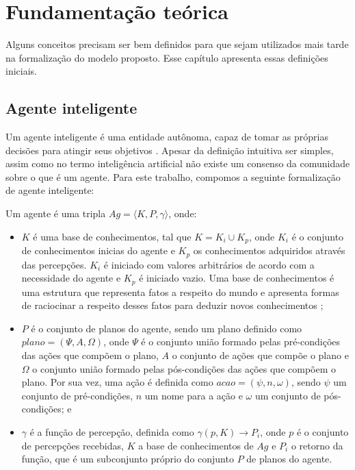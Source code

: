\section{Fundamentação teórica}

Alguns conceitos precisam ser bem definidos para que sejam utilizados mais tarde na formalização do modelo proposto. Esse capítulo apresenta essas definições iniciais.

\subsection{Agente inteligente}

Um agente inteligente é uma entidade autônoma, capaz de tomar as próprias decisões para atingir seus objetivos \cite{wooldridge1999intelligent}. Apesar da definição intuitiva ser simples, assim como no termo inteligência artificial não existe um consenso da comunidade sobre o que é um agente. Para este trabalho, compomos a seguinte formalização de agente inteligente:

\vspace{0.2cm}

\theoremstyle{definition}
\begin{definition}
    \label{def:agent}
    Um agente é uma tripla $Ag = \langle K, P, \gamma \rangle$, onde:
    \begin{itemize}
        \item $K$ é uma base de conhecimentos, tal que $K = K_i \cup K_p$, onde $K_i$ é o conjunto de conhecimentos inicias do agente e $K_p$ os conhecimentos adquiridos através das percepções. $K_i$ é iniciado com valores arbitrários de acordo com a necessidade do agente e $K_p$ é iniciado vazio. Uma base de conhecimentos é uma estrutura que representa fatos a respeito do mundo e apresenta formas de raciocinar a respeito desses fatos para deduzir novos conhecimentos \cite{hayes1983building};
        \item $P$ é o conjunto de planos do agente, sendo um plano definido como $plano = (\Psi, A, \Omega)$, onde $\Psi$ é o conjunto união formado pelas pré-condições das ações que compõem o plano, $A$ o conjunto de ações que compõe o plano e $\Omega$ o conjunto união formado pelas pós-condições das ações que compõem o plano. Por sua vez, uma ação é definida como $acao = (\psi, n, \omega)$, sendo $\psi$ um conjunto de pré-condições, $n$ um nome para a ação e $\omega$ um conjunto de pós-condições; e
        \item $\gamma$ é a função de percepção, definida como $ \gamma(p, K) \rightarrow P_i $, onde $p$ é o conjunto de percepções recebidas, $K$ a base de conhecimentos de $Ag$ e $P_i$ o retorno da função, que é um subconjunto próprio do conjunto $P$ de planos do agente.
    \end{itemize}{}
\end{definition}{}

